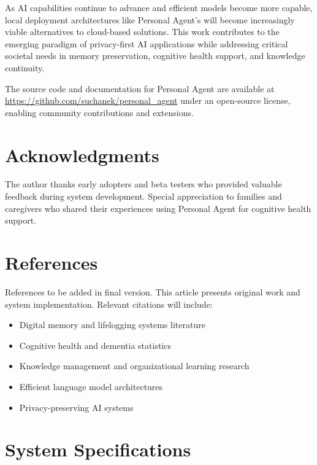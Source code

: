\documentclass[11pt,letterpaper]{article}
\begin{document}
As AI capabilities continue to advance and efficient models become more capable, local deployment architectures like Personal Agent's will become increasingly viable alternatives to cloud-based solutions. This work contributes to the emerging paradigm of privacy-first AI applications while addressing critical societal needs in memory preservation, cognitive health support, and knowledge continuity.

The source code and documentation for Personal Agent are available at \url{https://github.com/suchanek/personal_agent} under an open-source license, enabling community contributions and extensions.

\section*{Acknowledgments}

The author thanks early adopters and beta testers who provided valuable feedback during system development. Special appreciation to families and caregivers who shared their experiences using Personal Agent for cognitive health support.

\section*{References}

\begin{thebibliography}{99}

References to be added in final version. This article presents original work and system implementation. Relevant citations will include:
\begin{itemize}
\item Digital memory and lifelogging systems literature
\item Cognitive health and dementia statistics
\item Knowledge management and organizational learning research
\item Efficient language model architectures
\item Privacy-preserving AI systems
\end{itemize}

\end{thebibliography}

\appendix

\section{System Specifications}
\end{document}
